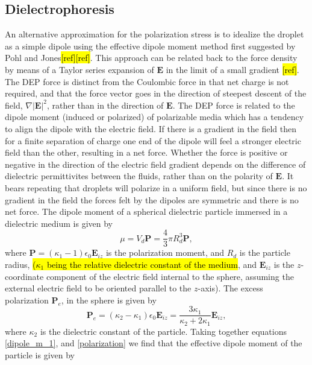 \documentclass[a4paper, 12pt]{article}
\begin{document}
\subsection{Dielectrophoresis}
An alternative approximation for the polarization stress is to idealize the droplet as a simple dipole using the effective dipole moment method first suggested by Pohl and Jones\hl{[ref][ref]}. This approach can be related back to the force density by means of a Taylor series expansion of $\mathbf{E}$ in the limit of a small gradient \hl{[ref]}. The DEP force is distinct from the Coulombic force in that net charge is not required, and that the force vector goes in the direction of steepest descent of the field, $\nabla \left| \mathbf{E} \right|^2$, rather than in the direction of $\mathbf{E}$. The DEP force is related to the dipole moment (induced or polarized) of polarizable media which has a tendency to align the dipole with the electric field. If there is a gradient in the field then for a finite separation of charge one end of the dipole will feel a stronger electric field than the other, resulting in a net force. Whether the force is positive or negative in the direction of the electric field gradient depends on the difference of dielectric permittivites between the fluids, rather than on the polarity of $\mathbf{E}$. It bears repeating that droplets will polarize in a uniform field, but since there is no gradient in the field the forces felt by the dipoles are symmetric and there is no net force. The dipole moment of a spherical dielectric particle immersed in a dielectric medium is given by
\begin{equation} \label{dipole_m_1}
\mu = V_d \mathbf{P} = \frac{4}{3} \pi R_d^3 \mathbf{P},
\end{equation} 
where $\mathbf{P} = \left(\kappa_1 - 1 \right) \epsilon_0 \mathbf{E}_{iz}$ is the polarization moment, and $R_d$ is the particle radius, \hl{($\kappa_1$ being the relative dielectric constant of the medium}, and $\mathbf{E}_{iz}$ is the $z$-coordinate component of the electric field internal to the sphere, assuming the external electric field to be oriented parallel to the $z$-axis). The excess polarization $\mathbf{P}_e$, in the sphere is given by
\begin{equation} \label{polarization}
\mathbf{P}_e = \left( \kappa_2 - \kappa_1 \right) \epsilon_0 \mathbf{E}_{iz} = \frac{3 \kappa_1}{\kappa_2 +2\kappa_1}\mathbf{E}_{iz},
\end{equation}
where $\kappa_2$ is the dielectric constant of the particle. Taking together equations \ref{dipole_m_1}, and \ref{polarization} we find that the effective dipole moment of the particle is given by 
\end{document}
